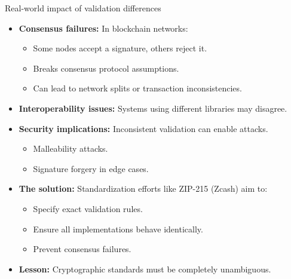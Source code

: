 \documentclass[aspectratio=169, lualatex, handout]{beamer}
\begin{document}
\begin{frame}{Real-world impact of validation differences}
	\begin{itemize}[<+->]
		\item \textbf{Consensus failures:} In blockchain networks:
		      \begin{itemize}
			      \item Some nodes accept a signature, others reject it.
			      \item Breaks consensus protocol assumptions.
			      \item Can lead to network splits or transaction inconsistencies.
		      \end{itemize}
		\item \textbf{Interoperability issues:} Systems using different libraries may disagree.
		\item \textbf{Security implications:} Inconsistent validation can enable attacks.
		      \begin{itemize}
			      \item Malleability attacks.
			      \item Signature forgery in edge cases.
		      \end{itemize}
		\item \textbf{The solution:} Standardization efforts like ZIP-215 (Zcash) aim to:
		      \begin{itemize}
			      \item Specify exact validation rules.
			      \item Ensure all implementations behave identically.
			      \item Prevent consensus failures.
		      \end{itemize}
		\item \textbf{Lesson:} Cryptographic standards must be completely unambiguous.
	\end{itemize}
\end{frame}
\end{document}
